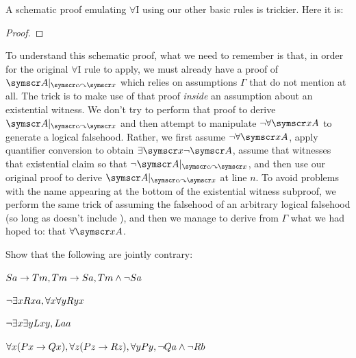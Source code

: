 A schematic proof emulating $\forall$I using our other basic rules is trickier. Here it is: 
\begin{proof}
	\have[\ ]{}{\vdots}
	\open
	\open
	\open
	\have[\ ]{}{\vdots}
	\close
	\close
	\close
\end{proof}
To understand this schematic proof, what we need to remember is that, in order for the original $\forall$I rule to apply, we must already have a proof of $\meta{A}\subs{\meta{c}}{\meta{x}}$ which relies on assumptions $\Gamma$ that do not mention  at all. The trick is to make use of that proof \emph{inside} an assumption about an existential witness. We don't try to perform that proof to derive $\meta{A}\subs{\meta{c}}{\meta{x}}$ and then attempt to manipulate $\enot\forall \meta{xA}$ to generate a logical falsehood. Rather, we first assume $\enot\forall \meta{xA}$, apply quantifier conversion to obtain $\exists \meta{x}\enot\meta{A}$, assume that  witnesses that existential claim so that $\enot\meta{A}\subs{\meta{c}}{\meta{x}}$, and then use our original proof to derive $\meta{A}\subs{\meta{c}}{\meta{x}}$ at line $n$. To avoid problems with the name appearing at the bottom of the existential witness subproof, we perform the same trick of assuming the falsehood of an arbitrary logical falsehood (so long as  doesn't include ), and then we manage to derive from $\Gamma$ what we had hoped to: that $\forall \meta{xA}$.


\practiceproblems

\problempart
Show that the following are jointly contrary:
\begin{earg}
\item $Sa\rightarrow Tm, Tm \rightarrow Sa, Tm \wedge \neg Sa$
\item $\neg\exists x Rxa, \forall x \forall y Ryx$
\item $\neg\exists x \exists y Lxy, Laa$
\item $\forall x(Px \rightarrow Qx), \forall z(Pz \rightarrow Rz), \forall y Py, \neg Qa \wedge \neg Rb$
\end{earg}


